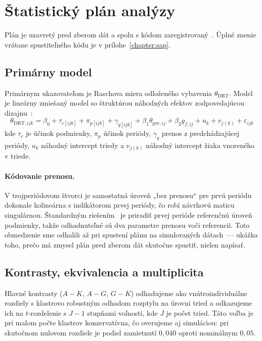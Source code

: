 \section{Štatistický plán analýzy}
\label{sec:sap}

Plán je uzavretý pred zberom dát a spolu s kódom zaregistrovaný~\cite{nosek2018preregistration}. Úplné znenie vrátane spustiteľného kódu je v prílohe~\ref{chapter:sap}.

\subsection{Primárny model}

Primárnym ukazovateľom je Raschova miera odloženého vybavenia $\theta_{\mathrm{DRT}}$. Model je lineárny zmiešaný model so štruktúrou náhodných efektov zodpovedajúcou dizajnu~\cite{barr2013maximal,bates2015lme4}:
\begin{equation}
    \theta_{\mathrm{DRT}, ijk} = \beta_0 + \tau_{c[ijk]} + \pi_{p[ijk]} + \gamma_{q[ijk]}
    + \beta_1\theta_{\mathrm{pre},ij} + \beta_2 g_{f,ij} + u_k + v_{j(k)} + \varepsilon_{ijk}
    \label{eq:model}
\end{equation}
kde $\tau_c$ je účinok podmienky, $\pi_p$ účinok periódy, $\gamma_q$ prenos z predchádzajúcej periódy, $u_k$ náhodný intercept triedy a $v_{j(k)}$ náhodný intercept žiaka vnoreného v triede.

\paragraph{Kódovanie prenosu.} V trojperiódovom štvorci je samostatná úroveň „bez prenosu“ pre prvú periódu dokonale kolineárna s indikátorom prvej periódy, čo robí návrhovú maticu singulárnou. Štandardným riešením~\cite{senn2002crossover} je priradiť prvej perióde referenčnú úroveň podmienky, takže odhadnuteľné sú dva parametre prenosu voči referencii. Toto obmedzenie sme odhalili až pri spustení plánu na simulovaných dátach~--- ukážka toho, prečo má zmysel plán pred zberom dát skutočne spustiť, nielen napísať.

\subsection{Kontrasty, ekvivalencia a multiplicita}
\label{subsec:kontrasty}

Hlavné kontrasty ($A-K$, $A-G$, $G-K$) odhadujeme ako vnútroindividuálne rozdiely s klastrovo robustným odhadom rozptylu na úrovni tried a odkazujeme ich na $t$-rozdelenie s $J-1$ stupňami voľnosti, kde $J$ je počet tried. Táto voľba je pri malom počte klastrov konzervatívna, čo overujeme aj simuláciou: pri skutočnom nulovom rozdiele je podiel zamietnutí $0{,}040$ oproti nominálnym $0{,}05$.

